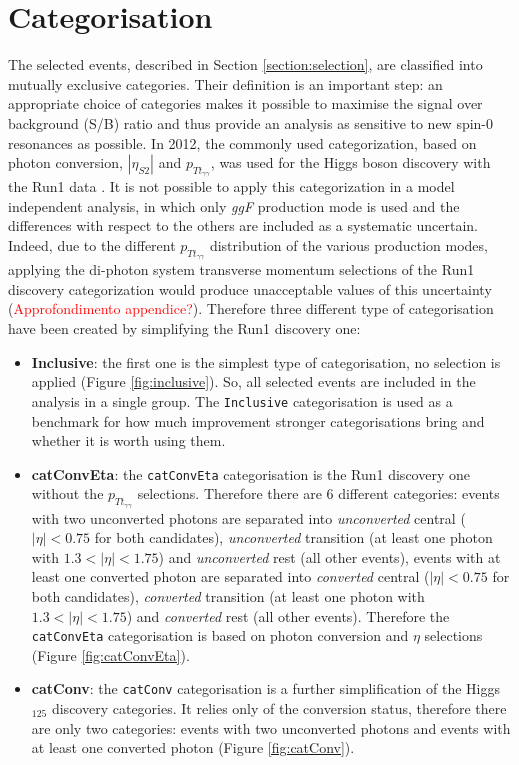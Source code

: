 \documentclass[a4paper, oneside, 11pt, openright]{book}
\begin{document}
 		\section{Categorisation}
 			The selected events, described in Section \ref{section:selection}, are classified into mutually exclusive categories. Their definition is an important step: an appropriate choice of categories makes it possible to maximise the signal over background (S/B) ratio and thus provide an analysis as sensitive to new spin-0 resonances as possible. In 2012, the commonly used categorization, based on photon conversion, $|\eta_{S2}|$ and $p_{Tt_{\gamma\gamma}}$, was used for the Higgs boson discovery with the Run1 data \cite{higgs_atlas}. It is not possible to apply this categorization in a model independent analysis, in which only \textit{ggF} production mode is used and the differences with respect to the others are included as a systematic uncertain. Indeed, due to the different $p_{Tt_{\gamma\gamma}}$ distribution of the various production modes, applying the di-photon system transverse momentum selections of the Run1 discovery categorization would produce unacceptable values of this uncertainty (\textcolor{red}{Approfondimento appendice?}). Therefore three different type of categorisation have been created by simplifying the Run1 discovery one:
 			\begin{itemize}
 				\item \textbf{Inclusive}: the first one is the simplest type of categorisation, no selection is applied (Figure \ref{fig:inclusive}). So, all selected events are included in the analysis in a single group. The \texttt{Inclusive} categorisation is used as a benchmark for how much improvement stronger categorisations bring and whether it is worth using them. 
 				\item \textbf{catConvEta}: the \texttt{catConvEta} categorisation is the Run1 discovery one without the $p_{Tt_{\gamma\gamma}}$ selections. Therefore there are 6 different categories: events with two unconverted photons are separated into \textit{unconverted} central ($|\eta|<0.75$ for both candidates), \textit{unconverted} transition (at least one photon with $1.3<|\eta|<1.75$) and \textit{unconverted} rest (all other events), events with at least one converted photon are separated into \textit{converted} central ($|\eta|<0.75$ for both candidates), \textit{converted} transition (at least one photon with $1.3<|\eta|<1.75$) and \textit{converted} rest (all other events). Therefore the \texttt{catConvEta} categorisation is based on photon conversion and $\eta$ selections (Figure \ref{fig:catConvEta}).
 				\item \textbf{catConv}: the \texttt{catConv} categorisation is a further simplification of the Higgs$_{125}$ discovery categories. It relies only of the conversion status, therefore there are only two categories: events with two unconverted photons and events with at least one converted photon (Figure \ref{fig:catConv}).
 			\end{itemize}
\end{document}
